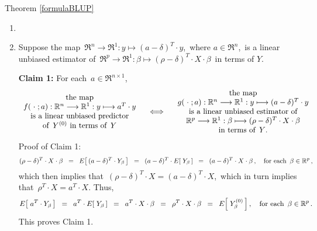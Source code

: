 \proofof Theorem \ref{formulaBLUP}
\begin{enumerate}
\item
\item
	Suppose the map
	\,$\Re^{n} \longrightarrow \Re^{1} : y \longmapsto (a - \delta)^{T}\cdot y$,\,
	where $a \in \Re^{n}$,\, is a linear unbiased estimator of 
	\,$\Re^{p} \longrightarrow \Re^{1} : \beta \longmapsto (\rho - \delta)^{T} \cdot X \cdot \beta$\,
	in terms of $Y$.

	\vskip 0.3cm
	\noindent
	\textbf{Claim 1:}\quad
	For each \,$a \in \Re^{n \times 1}$,
	\begin{equation*}
		\begin{array}{c}
		\textnormal{the map}
		\\
		f(\;\cdot\;;a) : \Re^{n} \longrightarrow \Re^{1} : y \longmapsto a^{T}\cdot y
		\\
		\textnormal{is a linear unbiased predictor}
		\\
		\textnormal{of \,$Y^{(0)}$ in terms of \,$Y$}
		\end{array}
	\quad\Longleftrightarrow\quad
		\begin{array}{c}
		\textnormal{the map}
		\\
		g(\;\cdot\;;a) : \Re^{n} \longrightarrow \Re^{1} : y \longmapsto (a - \delta)^{T}\cdot y
		\\
		\textnormal{is a linear unbiased estimator of}
		\\
		\Re^{p} \longrightarrow \Re^{1} : \beta \longmapsto (\rho - \delta)^{T} \cdot X \cdot \beta
		\\
		\textnormal{in terms of \,$Y$.}
		\end{array}
	\end{equation*}
	\noindent
	Proof of Claim 1:\quad
	\begin{equation*}
	(\rho - \delta)^{T} \cdot X \cdot \beta
	\;\; = \;\;
		E\!\left[\,(a - \delta)^{T}\cdot Y_{\beta}\,\right]
	\;\; = \;\;
		(a - \delta)^{T} \cdot E\!\left[\;Y_{\beta}\,\right]
	\;\; = \;\;
		(a - \delta)^{T} \cdot X \cdot \beta\,,
	\quad
	\textnormal{for each \,$\beta \in \Re^{p}$}\,,
	\end{equation*}
	which then implies that \,$(\rho - \delta)^{T} \cdot X  = (a - \delta)^{T} \cdot X$,\,
	which in turn implies that \,$\rho^{T} \cdot X  = a^{T} \cdot X$.
	Thus,
	\begin{equation*}
	E\!\left[\;a^{T} \cdot Y_{\beta}\,\right]
	\;\; = \;\;
		a^{T} \cdot E\!\left[\;Y_{\beta}\,\right]
	\;\; = \;\;
		a^{T} \cdot X \cdot \beta
	\;\; = \;\;
		\rho^{T} \cdot X \cdot \beta
	\;\; = \;\;
		E\!\left[\;Y^{(0)}_{\beta}\,\right],
	\quad\textnormal{for each \,$\beta \in \Re^{p}$}\,.
	\end{equation*}
	This proves Claim 1.


\end{enumerate}
